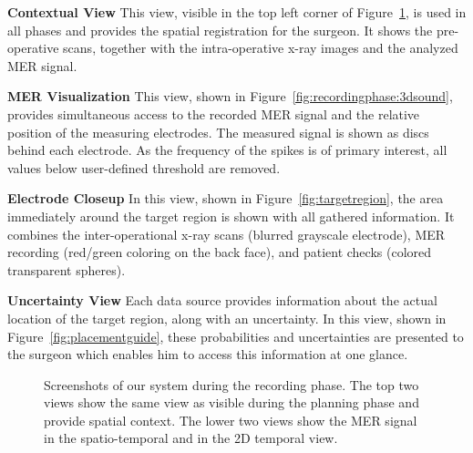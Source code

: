 \documentclass{egpubl}
\begin{document}
\noindent \textbf{Contextual View} This view, visible in the top left corner of Figure~\ref{fig:screenshot}, is used in all phases and provides the spatial registration for the surgeon. It shows the pre-operative scans, together with the intra-operative x-ray images and the analyzed MER signal.

\noindent \textbf{MER Visualization} This view, shown in Figure~\ref{fig:recordingphase:3dsound}, provides simultaneous access to the recorded MER signal and the relative position of the measuring electrodes. The measured signal is shown as discs behind each electrode. As the frequency of the spikes is of primary interest, all values below user-defined threshold are removed.

\noindent \textbf{Electrode Closeup} In this view, shown in Figure~\ref{fig:targetregion}, the area immediately around the target region is shown with all gathered information. It combines the inter-operational x-ray scans (blurred grayscale electrode), MER recording (red/green coloring on the back face), and patient checks (colored transparent spheres).

\noindent \textbf{Uncertainty View} Each data source provides information about the actual location of the target region, along with an uncertainty. In this view, shown in Figure~\ref{fig:placementguide}, these probabilities and uncertainties are presented to the surgeon which enables him to access this information at one glance.

\begin{figure}[t]
  \centering
  \caption{Screenshots of our system during the recording phase. The top two views show the same view as visible during the planning phase and provide spatial context. The lower two views show the MER signal in the spatio-temporal and in the 2D temporal view.}
  \label{fig:screenshot}
\end{figure}
\end{document}
